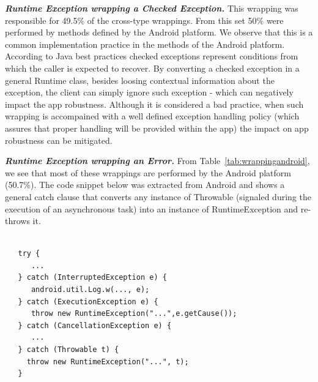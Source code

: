 \emph{\textbf{Runtime Exception wrapping a Checked Exception.}}
This wrapping was responsible for 49.5\% of
the cross-type wrappings.  From this set 50\%  were performed by methods defined by the Android platform.
We observe that this is a common implementation practice in the methods of the Android platform.
According to Java best practices checked exceptions represent conditions from which the caller
is expected to recover. By converting a checked exception in a general Runtime class,
besides loosing contextual information about the exception,
the client can simply ignore such exception - which can negatively impact the app robustness.
Although it is considered a bad practice, when such wrapping is accompained with a well defined
exception handling policy (which assures that proper handling will be provided within the app)
the impact on app robustness can be mitigated.

\bigskip


\bigskip

\emph{\textbf{Runtime Exception wrapping an Error.}}
From Table~\ref{tab:wrappingandroid}, we see that most of these wrappings
are performed by the Android platform (50.7\%).
The code snippet below was extracted from Android and shows a general catch clause
that converts any instance of Throwable (signaled during the execution
of an asynchronous task) into an instance of RuntimeException and re-throws it.

{\footnotesize
\begin{verbatim}

   try {
      ...
   } catch (InterruptedException e) {
      android.util.Log.w(..., e);
   } catch (ExecutionException e) {
      throw new RuntimeException("...",e.getCause());
   } catch (CancellationException e) {
      ...
   } catch (Throwable t) {
     throw new RuntimeException("...", t);
   }
\end{verbatim}
}

